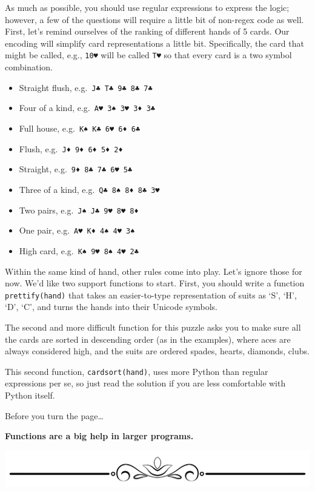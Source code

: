 As much as possible, you should use regular expressions to express the
logic; however, a few of the questions will require a little bit of
non-regex code as well. First, let's remind ourselves of the ranking of
different hands of 5 cards. Our encoding will simplify card
representations a little bit. Specifically, the card that might be
called, e.g., \texttt{10♥} will be called \texttt{T♥} so that every card
is a two symbol combination.

\begin{itemize}
\tightlist
\item
  Straight flush, e.g.~\texttt{J♣\ T♣\ 9♣\ 8♣\ 7♣}
\item
  Four of a kind, e.g.~\texttt{A♥\ 3♠\ 3♥\ 3♦\ 3♣}
\item
  Full house, e.g.~\texttt{K♠\ K♣\ 6♥\ 6♦\ 6♣}
\item
  Flush, e.g.~\texttt{J♦\ 9♦\ 6♦\ 5♦\ 2♦}
\item
  Straight, e.g.~\texttt{9♦\ 8♣\ 7♣\ 6♥\ 5♣}
\item
  Three of a kind, e.g.~\texttt{Q♣\ 8♠\ 8♦\ 8♣\ 3♥}
\item
  Two pairs, e.g.~\texttt{J♠\ J♣\ 9♥\ 8♥\ 8♦}
\item
  One pair, e.g.~\texttt{A♥\ K♦\ 4♠\ 4♥\ 3♠}
\item
  High card, e.g.~\texttt{K♠\ 9♥\ 8♠\ 4♥\ 2♣}
\end{itemize}

Within the same kind of hand, other rules come into play. Let's ignore
those for now. We'd like two support functions to start. First, you
should write a function \texttt{prettify(hand)} that takes an
easier-to-type representation of suits as `S', `H', `D', `C', and turns
the hands into their Unicode symbols.

\newpage

The second and more difficult function for this puzzle asks you to make
sure all the cards are sorted in descending order (as in the examples),
where aces are always considered high, and the suits are ordered spades,
hearts, diamonds, clubs.

This second function, \texttt{cardsort(hand)}, uses more Python than
regular expressions per se, so just read the solution if you are less
comfortable with Python itself.

Before you turn the page\ldots{}

\textbf{Functions are a big help in larger programs.}

\includegraphics{images/Elegant-Flourish-Frame-Extrapolated-19.svg}

